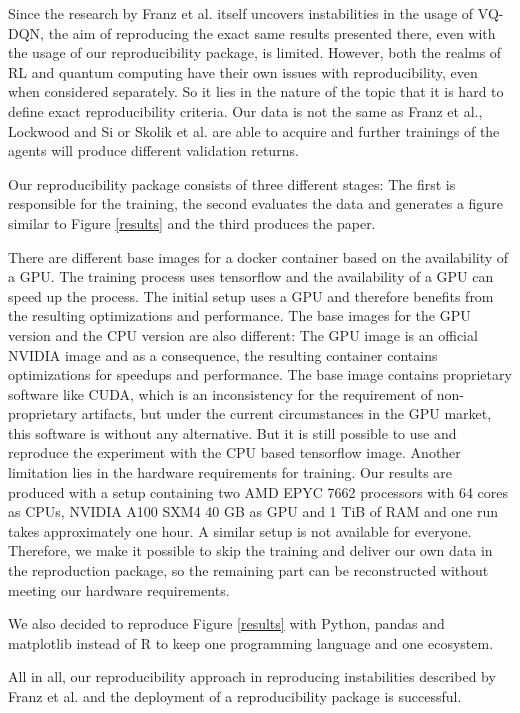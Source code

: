 Since the research by Franz et al. itself uncovers instabilities in the usage of \ac{VQ-DQN}, the aim of reproducing the exact same results presented there, even with the usage of our reproducibility package, is limited. 
However, both the realms of \ac{RL}\autocite{rlrepro} and quantum computing\autocite{quantumrepro} have their own issues with reproducibility, even when considered separately. 
So it lies in the nature of the topic that it is hard to define exact reproducibility criteria.
Our data is not the same as Franz et al., Lockwood and Si or Skolik et al. are able to acquire and further trainings of the agents will produce different validation returns.


Our reproducibility package consists of three different stages: The first is responsible for the training, the second evaluates the data and generates a figure similar to Figure \ref{results} and the third produces the paper. 

There are different base images for a docker container based on the availability of a GPU. 
The training process uses tensorflow and the availability of a GPU can speed up the process. 
The initial setup uses a GPU and therefore benefits from the resulting optimizations and performance.
The base images for the GPU version and the CPU version are also different: The GPU image is an official NVIDIA image and as a consequence, the resulting container contains optimizations for speedups and performance. 
The base image contains proprietary software like CUDA, which is an inconsistency for the requirement of non-proprietary artifacts, but under the current circumstances in the GPU market, this software is without any alternative.
But it is still possible to use and reproduce the experiment with the CPU based tensorflow image.
Another limitation lies in the hardware requirements for training. 
Our results are produced with a setup containing two AMD EPYC 7662 processors with 64 cores as CPUs, NVIDIA A100 SXM4 40 GB as GPU and 1 TiB of RAM and one run takes approximately one hour. 
A similar setup is not available for everyone.
Therefore, we make it possible to skip the training and deliver our own data in the reproduction package, so the remaining part can be reconstructed without meeting our hardware requirements. 

We also decided to reproduce Figure \ref{results} with Python, pandas and matplotlib instead of R to keep one programming language and one ecosystem. 

All in all, our reproducibility approach in reproducing instabilities described by Franz et al. and the deployment of a reproducibility package is successful.

